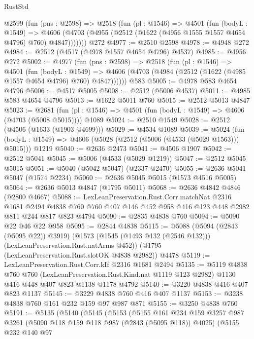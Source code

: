 \begin{lexlean}{RustStd}
\begin{coremodule}
    @2599
      (fun (pns : @2598) =>
      @2518
        (fun (pl : @1546) =>
        @4501
          (fun (bodyL : @1549) =>
          @4606 (@4703 (@4955 (@2512 (@1622 (@4956 @1555 @1557 @4654 @4796) @760) @4847)))))))
    @272
@4977 := @2510 @2598
@4978 := @4948 @272
@4984 := @2512 (@4517 (@4978 @1557 @4654 @4796) @4537)
@4985 := @4956 @272
@5002 := @4977
    (fun (pns : @2598) =>
    @2518
      (fun (pl : @1546) =>
      @4501
        (fun (bodyL : @1549) =>
        @4606 (@4703 (@4984 (@2512 (@1622 (@4985 @1557 @4654 @4796) @760) @4847))))))
    @583
@5005 := @4978 @583 @4654 @4796
@5006 := @4517 @5005
@5008 := @2512 (@5006 @4537)
@5011 := @4985 @583 @4654 @4796
@5013 := @1622 @5011 @760
@5015 := @2512 @5013 @4847
@5023 := @2681
    (fun (pl : @1546) => @4501 (fun (bodyL : @1549) => @4606 (@4703 (@5008 @5015))))
    @1089
@5024 := @2510 @1549
@5028 := @2512 (@4506 (@1633 (@1903 @4699)))
@5029 := @4534 @1089
@5039 := @5024
    (fun (bodyL : @1549) => @4606 (@5028 (@2512 (@5006 (@4533 (@5029 @1563))) @5015)))
    @1219
@5040 := @2636 @2473
@5041 := @4506 @1907
@5042 := @2512 @5041
@5045 := @5006 (@4533 (@5029 @1219))
@5047 := @2512 @5045 @5015
@5051 := @5040 (@5042 @5047) (@2337 @2470)
@5055 := @2636 @5041 @5047 (@1574 @2234)
@5060 := @2636 @5045 @5015 (@1573 @4516 @5005)
@5064 := @2636 @5013 @4847 (@1795 @5011)
@5068 := @2636 @4842 @4846 (@2800 @4667)
@5088 := LexLeanPreservation.Rust.Corr.matchNat
    @2316
    @1681
    @2494
    @4838
    @760
    @760
    @407
    @146
    @452
    @958
    @416
    @123
    @448
    @2982
    @811
    @244
    @817
    @823
    @4794
@5090 := @2835 @4838 @760
@5094 := @5090 @22 @46 @22 @958
@5095 := @2844 @4838
@5115 := @5088
    (@5094 (@2843 (@5095 @22)) @3919)
    (@1573 (@1545 (@1493 @132 (@2546 @132))) (LexLeanPreservation.Rust.natArms @452))
    (@1795 (LexLeanPreservation.Rust.slotOK @4838 @2982))
    @4478
@5119 := LexLeanPreservation.Rust.Corr.kIf @2316 @1681 @2494
@5135 := @5119
    @4838
    @760
    @760
    (LexLeanPreservation.Rust.Kind.nat @1119 @123 @2982)
    @1130
    @416
    @448
    @407
    @823
    @1138
    @1178
    @4792
@5140 := @3220 @4838 @416 @407 @823 @1137
@5145 := @3229 @4838 @760 @416 @407 @1137
@5153 := @3238 @4838 @760 @161 @232 @159 @97 @987 @871
@5155 := @3250 @4838 @760
@5191 := @5135
    (@5140
      (@5145
        (@5153
          (@5155
            @161
            @234
            @159
            @3257
            @987
            @3261
            (@5090 @118 @159 @118 @987 (@2843 (@5095 @118)) @4025)
            (@5155
              @232
              @140
              @97

\end{coremodule}
\end{lexlean}
